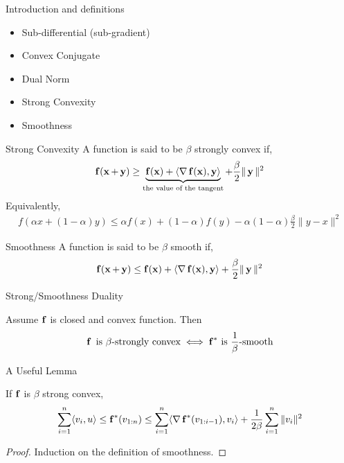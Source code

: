 
\begin{frame}{Introduction and definitions}
  \begin{itemize}
  \item Sub-differential (sub-gradient)
  \item Convex Conjugate
  \item Dual Norm
  \item Strong Convexity
  \item Smoothness
  \end{itemize}
\end{frame}

\begin{frame}{Strong Convexity}
  A function is said to be $\beta$ strongly convex if,
  \begin{align*}
    \operatorname{\mathbf{f}}(\operatorname{\mathbf{x}}+\operatorname{\mathbf{y}}) \ge \underbrace{\operatorname{\mathbf{f}}(\operatorname{\mathbf{x}}) + \langle {\operatorname{\nabla}\operatorname{\mathbf{f}}(\operatorname{\mathbf{x}})} , {\operatorname{\mathbf{y}}} \rangle}_{\text{the value of the tangent}} +\frac{\beta}{2} \|\operatorname{\mathbf{y}}\|^2
  \end{align*}
  Equivalently,
  \begin{align*}
    f(\alpha x +(1-\alpha)y) \le \alpha f(x) + (1-\alpha)f(y) - \alpha(1-\alpha)\frac{\beta}{2} \|y-x\|^2
  \end{align*}
\end{frame}

\begin{frame}{Smoothness}
  A function is said to be $\beta$ smooth if,
  \begin{align*}
    \operatorname{\mathbf{f}}(\operatorname{\mathbf{x}}+\operatorname{\mathbf{y}}) \le \operatorname{\mathbf{f}}(\operatorname{\mathbf{x}}) + \langle {\operatorname{\nabla}\operatorname{\mathbf{f}}(\operatorname{\mathbf{x}})} , {\operatorname{\mathbf{y}}} \rangle +\frac{\beta}{2} \|\operatorname{\mathbf{y}}\|^2
  \end{align*}
\end{frame}

\begin{frame}{Strong/Smoothness Duality}
  \begin{theorem}
    Assume $\operatorname{\mathbf{f}}$ is closed and convex function. Then
    \begin{align*}
      \operatorname{\mathbf{f}} \text{ is } \beta\text{-strongly convex} \iff {\operatorname{\mathbf{f}}}^{*} \text{ is } \frac{1}{\beta}\text{-smooth}
    \end{align*}
  \end{theorem}
\end{frame}

\begin{frame}{A Useful Lemma}
  \begin{lemma}
    If $\operatorname{\mathbf{f}}$ is $\beta$ strong convex,
    \begin{align*}
      \sum_{i=1}^n \langle {v_i} , {u} \rangle \le {\operatorname{\mathbf{f}}}^{*}(v_{1:n}) \le \sum_{i=1}^n \langle {\operatorname{\nabla}{\operatorname{\mathbf{f}}}^{*}(v_{1:i-1})} , {v_i} \rangle +\frac{1}{2\beta} \sum_{i=1}^n \|v_i\|^2
    \end{align*}
  \end{lemma}
  \begin{proof}
    Induction on the definition of smoothness.
  \end{proof}
\end{frame}

